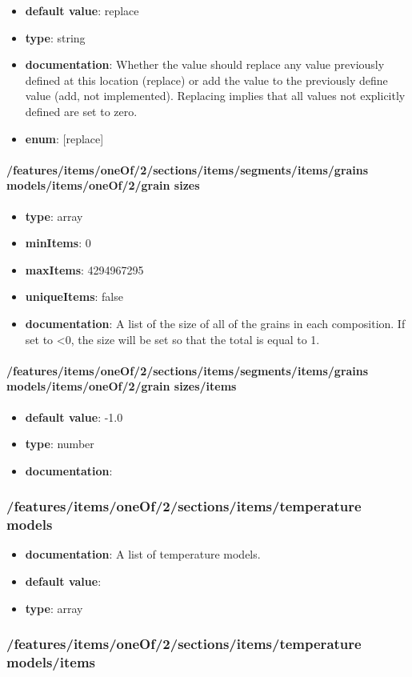 \begin{itemize}\item {\bf default value}: replace
\item {\bf type}: string
\item {\bf documentation}: Whether the value should replace any value previously defined at this location (replace) or add the value to the previously define value (add, not implemented). Replacing implies that all values not explicitly defined are set to zero.
\item {\bf enum}: [replace]\end{itemize}\paragraph{/features/items/oneOf/2/sections/items/segments/items/grains models/items/oneOf/2/grain sizes}
\begin{itemize}\item {\bf type}: array
\item {\bf minItems}: 0
\item {\bf maxItems}: 4294967295
\item {\bf uniqueItems}: false
\item {\bf documentation}: A list of the size of all of the grains in each composition. If set to <0, the size will be set so that the total is equal to 1.
\end{itemize}\paragraph{/features/items/oneOf/2/sections/items/segments/items/grains models/items/oneOf/2/grain sizes/items}
\begin{itemize}\item {\bf default value}: -1.0
\item {\bf type}: number
\item {\bf documentation}: 
\end{itemize}\subsubsection{/features/items/oneOf/2/sections/items/temperature models}
\begin{itemize}\item {\bf documentation}: A list of temperature models.
\item {\bf default value}: 
\item {\bf type}: array
\end{itemize}\subsubsection{/features/items/oneOf/2/sections/items/temperature models/items}

